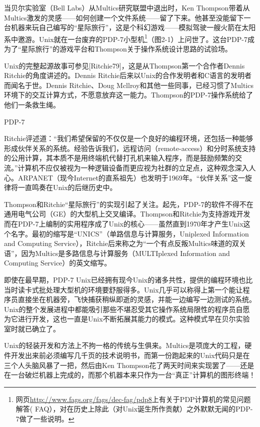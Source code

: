 \documentclass[11pt,oneside]{book}
\begin{document}
\begin{common-format}
当贝尔实验室（Bell Labs）从Multics研究联盟中退出时，Ken Thompson带着从Multics激发的灵感——如何创建一个文件系统——留了下来。他甚至没能留下一台机器来玩自己编写的“星际旅行”，这是个科幻游戏——模拟驾驶一艘火箭在太阳系中邀游。Unix就在一台废弃的PDP-7小型机\footnote{网页\href{http://www.fags.org/fags/dec-fag/pdp8}{http://www.fags.org/fags/dec-fag/pdp8}上有关于PDP计算机的常见问题解答( FAQ），对在历史上除此（对Unix诞生所作贡献）之外默默无闻的PDP-7做了一些说明。}（图2-1）上问世了。这台PDP-7成为了“星际旅行”的游戏平台和Thompson关于操作系统设计思路的试验场。

Unix的完整起源故事可参见[Ritchie79]，这是从Thompson第一个合作者Dennis Ritchie的角度讲述的。Dennis Ritchie后来以Unix的合作发明者和C语言的发明者而闻名于世。Dennis Ritchie、Doug Mcllroy和其他一些同事，已经习惯了Multics环境下的交互计算方式，不愿意放弃这一能力。Thompson的PDP-7操作系统给了他们一条救生绳。

\begin{fig}[2]{PDP-7}
\label{fig:PDP-7}
\end{fig}

Ritchie评述道：“我们希望保留的不仅仅是一个良好的编程环境，还包括一种能够形成伙伴关系的系统。经验告诉我们，远程访问（remote-access）和分时系统支持的公用计算，其本质不是用终端机代替打孔机来输入程序，而是鼓励频繁的交流。”计算机不应仅被视为一种逻辑设备而更应视为社群的立足点，这种观念深入人心。ARPANET（现今Internet的直系祖先）也发明于1969年。“伙伴关系”这一旋律将一直鸣奏在Unix的后继历史中。

Thompson和Ritchie“星际旅行”的实现引起了关注。起先，PDP-7的软件不得不在通用电气公司（GE）的大型机上交叉编译。Thompson和Ritchie为支持游戏开发而在PDP-7上编制的实用程序成了Unix的核心——虽然直到1970年才产生Unix这个名字。最初的缩写是“UNICS”（单路信息与计算服务，Uniplexed Information and Computing Service），Ritchie后来称之为“一个有点反叛Multics味道的双关语”，因为Multics是多路信息与计算服务（MULTIplexed Information and Computing Service）的英文缩写。

即使在最早期，PDP-7 Unix已经拥有现今Unix的诸多共性，提供的编程环境也比当时读卡式批处理大型机的环境要舒服得多。Unix几乎可以称得上第一个能让程序员直接坐在机器旁，飞快捕获稍纵即逝的灵感，并能一边编写一边测试的系统。Unix的整个发展进程中都能吸引那些不堪忍受其它操作系统局限性的程序员自愿为它进行开发，这也一直是Unix不断拓展其能力的模式。这种模式早在贝尔实验室时就已确立了。

Unix的轻装开发和方法上不拘一格的传统与生俱来。Multics是项庞大的工程，硬件开发出来前必须编写几千页的技术说明书，而第一份跑起来的Unix代码只是在三个人头脑风暴了一把，然后由Ken Thompson花了两天时间来实现罢了——还是在一台破烂机器上完成的，而那个机器本来只作为一台“真正”计算机的图形终端！


\end{common-format}
\end{document}
